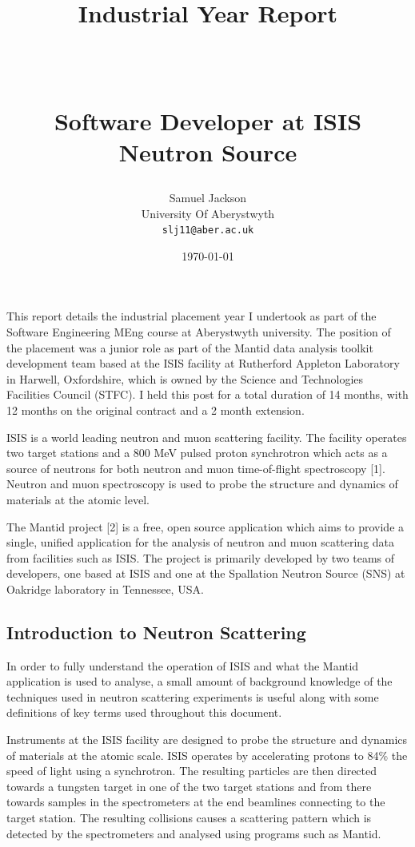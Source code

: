 \documentclass[paper=a4, fontsize=11pt]{scrartcl}	%
\title{
	\vspace{-1in} 	\usefont{OT1}{bch}{b}{n}
	\huge \strut Industrial Year Report \strut \\
	\Large \bfseries \strut Software Developer at ISIS Neutron Source \strut
}
\author{
	\usefont{OT1}{bch}{m}{n} Samuel Jackson
	\\ \usefont{OT1}{bch}{m}{n} University Of Aberystwyth
	\\   \texttt{slj11@aber.ac.uk}
}
\date{\today}
\numberwithin{equation}{section}															%
\numberwithin{figure}{section}																%
\numberwithin{table}{section}
\begin{document}
	\maketitle
	\clearpage
	\tableofcontents
	\clearpage

This report details the industrial placement year I undertook as part of
the Software Engineering MEng course at Aberystwyth university. The
position of the placement was a junior role as part of the Mantid data
analysis toolkit development team based at the ISIS facility at
Rutherford Appleton Laboratory in Harwell, Oxfordshire, which is owned
by the Science and Technologies Facilities Council (STFC). I held this
post for a total duration of 14 months, with 12 months on the original
contract and a 2 month extension.

ISIS is a world leading neutron and muon scattering facility. The
facility operates two target stations and a 800 MeV pulsed proton
synchrotron which acts as a source of neutrons for both neutron and muon
time-of-flight spectroscopy {[}1{]}. Neutron and muon spectroscopy is
used to probe the structure and dynamics of materials at the atomic
level.

The Mantid project {[}2{]} is a free, open source application which aims
to provide a single, unified application for the analysis of neutron and
muon scattering data from facilities such as ISIS. The project is
primarily developed by two teams of developers, one based at ISIS and
one at the Spallation Neutron Source (SNS) at Oakridge laboratory in
Tennessee, USA.

\subsection{Introduction to Neutron
Scattering}\label{introduction-to-neutron-scattering}

In order to fully understand the operation of ISIS and what the Mantid
application is used to analyse, a small amount of background knowledge
of the techniques used in neutron scattering experiments is useful along
with some definitions of key terms used throughout this document.

Instruments at the ISIS facility are designed to probe the structure and
dynamics of materials at the atomic scale. ISIS operates by accelerating
protons to 84\% the speed of light using a synchrotron. The resulting
particles are then directed towards a tungsten target in one of the two
target stations and from there towards samples in the spectrometers at the end beamlines connecting to the target station. The resulting collisions causes a scattering pattern which is detected by the spectrometers and analysed
using programs such as Mantid.
\end{document}
